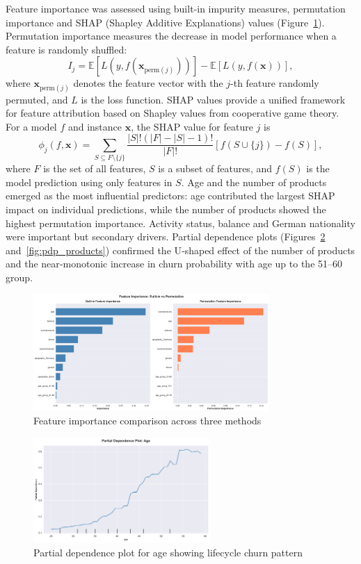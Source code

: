 \documentclass[12pt]{article}
\begin{document}
Feature importance was assessed using built‑in impurity measures, permutation importance and SHAP (Shapley Additive Explanations) values (Figure~\ref{fig:feature_importance}).  Permutation importance measures the decrease in model performance when a feature is randomly shuffled:
\[ I_j = \mathbb{E}[L(y, f(\mathbf{x}_{\text{perm}(j)}))] - \mathbb{E}[L(y, f(\mathbf{x}))], \]
where \(\mathbf{x}_{\text{perm}(j)}\) denotes the feature vector with the \(j\)-th feature randomly permuted, and \(L\) is the loss function.  SHAP values provide a unified framework for feature attribution based on Shapley values from cooperative game theory.  For a model \(f\) and instance \(\mathbf{x}\), the SHAP value for feature \(j\) is
\[ \phi_j(f, \mathbf{x}) = \sum_{S \subseteq F \setminus \{j\}} \frac{|S|!(|F| - |S| - 1)!}{|F|!} [f(S \cup \{j\}) - f(S)], \]
where \(F\) is the set of all features, \(S\) is a subset of features, and \(f(S)\) is the model prediction using only features in \(S\).  Age and the number of products emerged as the most influential predictors: age contributed the largest SHAP impact on individual predictions, while the number of products showed the highest permutation importance.  Activity status, balance and German nationality were important but secondary drivers.  Partial dependence plots (Figures~\ref{fig:pdp_age} and~\ref{fig:pdp_products}) confirmed the U‑shaped effect of the number of products and the near‑monotonic increase in churn probability with age up to the 51–60 group.

\begin{figure}[H]
\centering
\includegraphics[width=0.8\textwidth]{img/15_feature_importance_comparison.png}
\caption{Feature importance comparison across three methods}
\label{fig:feature_importance}
\end{figure}

\begin{figure}[H]
\centering
\includegraphics[width=0.6\textwidth]{img/18_pdp_age.png}
\caption{Partial dependence plot for age showing lifecycle churn pattern}
\label{fig:pdp_age}
\end{figure}
\end{document}
